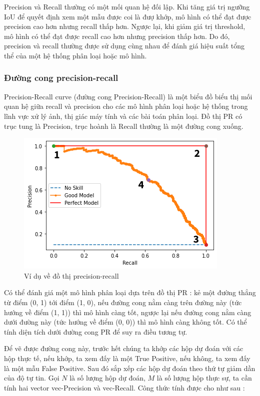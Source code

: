 \documentclass[a4paper]{article}
\begin{document}
Precision và Recall thường có một mối quan hệ đối lập. Khi tăng giá trị ngưỡng IoU để quyết định xem một mẫu được coi là đượ khớp, mô hình có thể đạt được precision cao hơn nhưng recall thấp hơn. Ngược lại, khi giảm giá trị threshold, mô hình có thể đạt được recall cao hơn nhưng precision thấp hơn. Do đó, precision và recall thường được sử dụng cùng nhau để đánh giá hiệu suất tổng thể của một hệ thống phân loại hoặc mô hình.



\subsubsection{\textbf{Đường cong precision-recall }}

Precision-Recall curve (đường cong Precision-Recall) là một biểu đồ biểu thị mối quan hệ giữa recall và precision cho các mô hình phân loại hoặc hệ thống trong lĩnh vực xử lý ảnh, thị giác máy tính và các bài toán phân loại. Đồ thị PR có trục tung là Precision, trục hoành là Recall thường là một đường cong xuống.

\begin{figure}[h]
	\centering
	\includegraphics[width=0.5\linewidth]{fig/good.png-mh}
	\caption{Ví dụ về đồ thị precision-recall}
	\label{fig:good}
\end{figure}

Có thể đánh giá một mô hình phân loại dựa trên đồ thị PR : kẻ một đường thẳng từ điểm (0, 1) tới điểm (1, 0), nếu đường cong nằm càng trên đường này (tức hướng về điểm (1, 1)) thì mô hình càng tốt, ngược lại nếu đường cong nằm càng dưới đường này (tức hướng về điểm (0, 0)) thì mô hình càng không tốt. Có thể tính diện tích dưới đường cong PR để suy ra điều tương tự.

Để vẽ được đường cong này, trước hết chúng ta khớp các hộp dự đoán với các hộp thực tế, nếu khớp, ta xem đấy là một True Positive, nếu không, ta xem đấy là một mẫu False Positive. Sau đó sắp xếp các hộp dự đoán theo thứ tự giảm dần của độ tự tin. Gọi $N$ là số lượng hộp dự đoán, $M$ là số lượng hộp thực sự, ta cần tính hai vector vec-Precision và vec-Recall. Công thức tính được cho như sau : 
\end{document}
